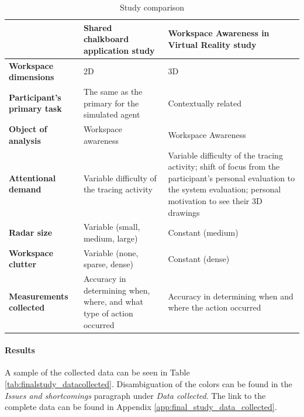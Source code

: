 \begin{table}[h]
  \caption{Study comparison}
  \label{table:study_comp}
  \begin{tabularx}{\linewidth}{|X|X|X|}
  \hline
                             & \textbf{Shared chalkboard application study}                & \textbf{Workspace Awareness in Virtual Reality study}           \\ \hline
  \centering \textbf{Workspace dimensions}				 & 2D									   & 3D \\ \hline
  \centering \textbf{Participant's primary task} & The same as the primary for the simulated agent & Contextually related \\ \hline
  \centering \textbf{Object of analysis}         & Workspace awareness   & Workspace Awareness  \\ \hline
	\centering \textbf{Attentional demand}         & Variable difficulty of the tracing activity   & Variable difficulty of the tracing activity; shift of focus from the participant's personal evaluation to the system evaluation; personal motivation to see their 3D drawings \\ \hline
	  \centering \textbf{Radar size}         & Variable (small, medium, large)   & Constant (medium)  \\ \hline
	    \centering \textbf{Workspace clutter}         & Variable (none, sparse, dense)   & Constant (dense)  \\ \hline
	    \centering \textbf{Measurements collected}         & Accuracy in determining when, where, and what type of action occurred   & Accuracy in determining when and where the action occurred  \\ \hline
  \end{tabularx}
\end{table}

\paragraph{Results}
A sample of the collected data can be seen in Table  \ref{tab:finalstudy_datacollected}. Disambiguation of the colors can be found in the \textit{Issues and shortcomings }paragraph under \textit{Data collected}. The link to the complete data can be found in Appendix \ref{app:final_study_data_collected}.


